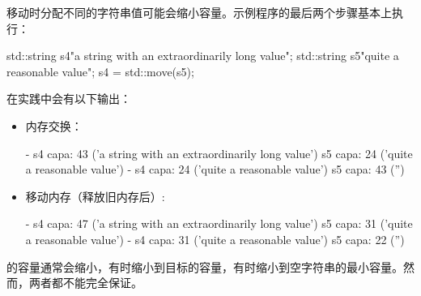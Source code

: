 移动时分配不同的字符串值可能会缩小容量。示例程序的最后两个步骤基本上执行：

\begin{cppcode}
std::string s4{"a string with an extraordinarily long value"};
std::string s5{"quite a reasonable value"};
s4 = std::move(s5);
\end{cppcode}

在实践中会有以下输出：

\begin{itemize}
	\item 内存交换：
	\begin{outputcode}
- s4 capa: 43 ('a string with an extraordinarily long value')
s5 capa: 24 ('quite a reasonable value')
- s4 capa: 24 ('quite a reasonable value')
s5 capa: 43 ('')
	\end{outputcode}
	\item 移动内存（释放旧内存后）:
	\begin{outputcode}
- s4 capa: 47 ('a string with an extraordinarily long value')
s5 capa: 31 ('quite a reasonable value')
- s4 capa: 31 ('quite a reasonable value')
s5 capa: 22 ('')
	\end{outputcode}
\end{itemize}

 的容量通常会缩小，有时缩小到目标的容量，有时缩小到空字符串的最小容量。然而，两者都不能完全保证。
